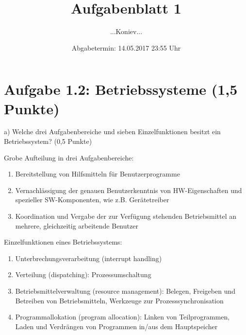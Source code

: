 \documentclass[a4paper,12pt]{article}
\author{...Koniev...}    %
\title{Aufgabenblatt 1}
\date{Abgabetermin: 14.05.2017 23:55 Uhr}
\begin{document}
 

\maketitle

\section*{Aufgabe 1.2: Betriebssysteme (1,5 Punkte)}
 a) Welche drei Aufgabenbereiche und sieben Einzelfunktionen besitzt ein Betriebssystem? (0,5 Punkte)
 
\vspace{\baselineskip}
 \large Grobe Aufteilung in drei Aufgabenbereiche:
 
 \normalsize
 \begin{enumerate}
 	\item Bereitstellung von Hilfsmitteln für Benutzerprogramme
 	\item Vernachlässigung der genauen Benutzerkenntnis von HW-Eigenschaften und spezieller SW-Komponenten, wie z.B. Gerätetreiber
 	\item Koordination und Vergabe der zur Verfügung stehenden Betriebsmittel an mehrere, gleichzeitig arbeitende Benutzer
 \end{enumerate}


\vspace{\baselineskip}
\large Einzelfunktionen eines Betriebssystems:
\normalsize
\begin{enumerate}
	\item Unterbrechungsverarbeitung (interrupt handling)
	\item Verteilung (dispatching): Prozessumschaltung
	\item Betriebsmittelverwaltung (resource management): Belegen, Freigeben und Betreiben von Betriebsmitteln, Werkzeuge zur Prozesssynchronisation
	\item Programmallokation (program allocation): Linken von Teilprogrammen, Laden und Verdrängen von Programmen in/aus dem Hauptspeicher
\end{enumerate}
\end{document}
